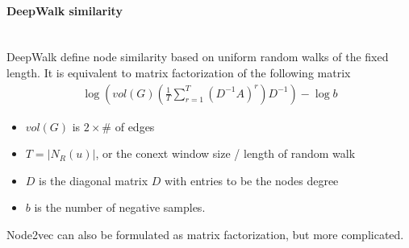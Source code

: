 \paragraph{DeepWalk similarity}\mbox{}\\
DeepWalk define node similarity based on uniform random walks of the fixed length. It is equivalent to matrix factorization of the following matrix 
    \begin{align*}
        \log\left (vol(G)(\frac{1}{T}\sum_{r=1}^T (D^{-1}A)^r)D^{-1}\right )-\log b
    \end{align*}
    \begin{itemize}
        \item $vol(G)$ is $2 \times \#$ of edges
        \item $T=|N_R(u)|$, or the conext window size / length of random walk 
        \item $D$ is the diagonal matrix $D$ with entries to be the nodes degree 
        \item $b$ is the number of negative samples. 
    \end{itemize}
Node2vec can also be formulated as matrix factorization, but more complicated. 


